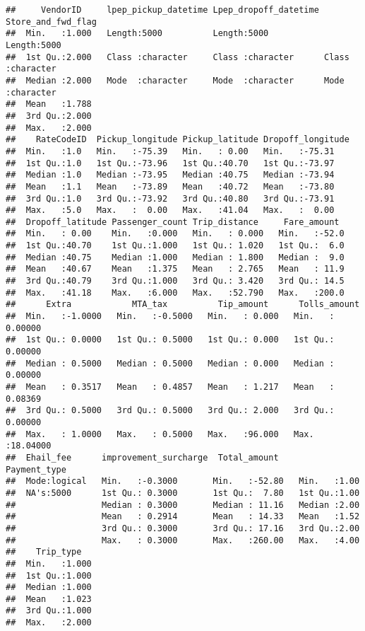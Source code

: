 \documentclass[
  18pt,
  a4paper]{article}
\begin{document}
\begin{verbatim}
##     VendorID     lpep_pickup_datetime Lpep_dropoff_datetime Store_and_fwd_flag
##  Min.   :1.000   Length:5000          Length:5000           Length:5000       
##  1st Qu.:2.000   Class :character     Class :character      Class :character  
##  Median :2.000   Mode  :character     Mode  :character      Mode  :character  
##  Mean   :1.788                                                                
##  3rd Qu.:2.000                                                                
##  Max.   :2.000                                                                
##    RateCodeID  Pickup_longitude Pickup_latitude Dropoff_longitude
##  Min.   :1.0   Min.   :-75.39   Min.   : 0.00   Min.   :-75.31   
##  1st Qu.:1.0   1st Qu.:-73.96   1st Qu.:40.70   1st Qu.:-73.97   
##  Median :1.0   Median :-73.95   Median :40.75   Median :-73.94   
##  Mean   :1.1   Mean   :-73.89   Mean   :40.72   Mean   :-73.80   
##  3rd Qu.:1.0   3rd Qu.:-73.92   3rd Qu.:40.80   3rd Qu.:-73.91   
##  Max.   :5.0   Max.   :  0.00   Max.   :41.04   Max.   :  0.00   
##  Dropoff_latitude Passenger_count Trip_distance     Fare_amount   
##  Min.   : 0.00    Min.   :0.000   Min.   : 0.000   Min.   :-52.0  
##  1st Qu.:40.70    1st Qu.:1.000   1st Qu.: 1.020   1st Qu.:  6.0  
##  Median :40.75    Median :1.000   Median : 1.800   Median :  9.0  
##  Mean   :40.67    Mean   :1.375   Mean   : 2.765   Mean   : 11.9  
##  3rd Qu.:40.79    3rd Qu.:1.000   3rd Qu.: 3.420   3rd Qu.: 14.5  
##  Max.   :41.18    Max.   :6.000   Max.   :52.790   Max.   :200.0  
##      Extra            MTA_tax          Tip_amount      Tolls_amount     
##  Min.   :-1.0000   Min.   :-0.5000   Min.   : 0.000   Min.   : 0.00000  
##  1st Qu.: 0.0000   1st Qu.: 0.5000   1st Qu.: 0.000   1st Qu.: 0.00000  
##  Median : 0.5000   Median : 0.5000   Median : 0.000   Median : 0.00000  
##  Mean   : 0.3517   Mean   : 0.4857   Mean   : 1.217   Mean   : 0.08369  
##  3rd Qu.: 0.5000   3rd Qu.: 0.5000   3rd Qu.: 2.000   3rd Qu.: 0.00000  
##  Max.   : 1.0000   Max.   : 0.5000   Max.   :96.000   Max.   :18.04000  
##  Ehail_fee      improvement_surcharge  Total_amount     Payment_type 
##  Mode:logical   Min.   :-0.3000       Min.   :-52.80   Min.   :1.00  
##  NA's:5000      1st Qu.: 0.3000       1st Qu.:  7.80   1st Qu.:1.00  
##                 Median : 0.3000       Median : 11.16   Median :2.00  
##                 Mean   : 0.2914       Mean   : 14.33   Mean   :1.52  
##                 3rd Qu.: 0.3000       3rd Qu.: 17.16   3rd Qu.:2.00  
##                 Max.   : 0.3000       Max.   :260.00   Max.   :4.00  
##    Trip_type    
##  Min.   :1.000  
##  1st Qu.:1.000  
##  Median :1.000  
##  Mean   :1.023  
##  3rd Qu.:1.000  
##  Max.   :2.000
\end{verbatim}
\end{document}
